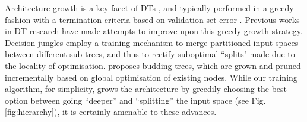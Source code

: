 Architecture growth is a key facet of DTs \cite{criminisi2013decision}, and typically performed in a greedy fashion with a termination criteria based on validation set error \cite{suarez1999globally,irsoy2012soft}. Previous works in DT research have made attempts to improve upon this greedy growth strategy. Decision jungles \cite{shotton2013decision} employ a training mechanism to merge partitioned input spaces between different sub-trees, and thus to rectify suboptimal ``splits" made due to the locality of optimisation. \cite{irsoy2014budding} proposes budding trees, which are grown and pruned incrementally based on global optimisation of existing nodes. While our training algorithm, for simplicity, grows the architecture by
greedily choosing the best option between going “deeper” and “splitting” the input space (see Fig. \ref{fig:hierarchy}), it is certainly amenable to these advances. 





